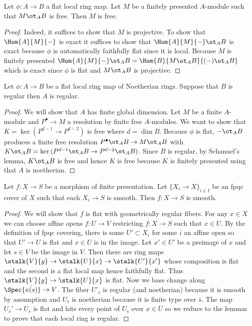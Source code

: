 \documentclass[12pt]{article}
\begin{document}
\begin{lemma}
Let $\phi : A \to B$ a flat local ring map. Let $M$ be a finitely presented $A$-module such that $M \ot_A B$ is free. Then $M$ is free.
\end{lemma}

\begin{proof}
Indeed, it suffices to show that $M$ is projective. To show that $\Hom{A}{M}{-}$ is exact it suffices to show that $\Hom{A}{M}{-} \ot_A B$ is exact because $\phi$ is automatically faithfully flat since it is local. Because $M$ is finitely presented $\Hom{A}{M}{-} \ot_A B = \Hom{B}{M \ot_A B}{(-) \ot_A B}$ which is exact since $\phi$ is flat and $M \ot_A B$ is projective.
\end{proof}

\begin{lemma}
Let $\phi : A \to B$ be a flat local ring map of Noetherian rings. Suppose that $B$ is regular then $A$ is regular.
\end{lemma}

\begin{proof}
We will show that $A$ has finite global dimension. Let $M$ be a finite $A$-module and $P^\bullet \to M$ a resolution by finite free $A$-modules. We want to show that $K = \ker{(P^{d-1} \to P^{d-2})}$ is free where $d = \dim{B}$. Because $\phi$ is flat, $-\ot_A B$ produces a finite free resolution $P^\bullet \ot_A B \to M \ot_A B$ with $K \ot_A B = \ker{(P^{d-1} \ot_A B \to P^{d-2} \ot_A B)}$. Since $B$ is regular, by Schanuel's lemma, $K \ot_A B$ is free and hence $K$ is free because $K$ is finitely presented using that $A$ is noetherian.
\end{proof}

\begin{prop}
Let $f : X \to S$ be a morphism of finite presentation. Let $\{ X_i \to X \}_{i \in I}$ be an fpqc cover of $X$ such that each $X_i \to S$ is smooth. Then $f : X \to S$ is smooth.
\end{prop}

\begin{proof}
We will show that $f$ is flat with geometrically regular fibers. For any $x \in X$ we can choose affine opens $f : U \to V$ restricting $f : X \to S$ such that $x \in U$. By the definition of fpqc covering, there is some $U' \subset X_i$ for some $i$ an affine open so that $U' \to U$ is flat and $x \in U$ is in the image. Let $x' \in U'$ be a preimage of $x$ and let $s \in V$ be the image in $V$. Then there are ring maps $\stalk{V}{y} \to \stalk{U}{x} \to \stalk{U'}{x'}$ whose composition is flat and the second is a flat local map hence faithfully flat. Thus $\stalk{V}{y} \to \stalk{U}{x}$ is flat. Now we base change along $\Spec{\bar{\kappa(s)}} \to V$. The fiber $U'_{\bar{s}}$ is regular (and noetherian) because it is smooth by assumption and $U_{\bar{s}}$ is noetherian because it is finite type over $\bar{s}$. The map $U_{\bar{s}}' \to U_{\bar{s}}$ is flat and hits every point of $U_{\bar{s}}$ over $x \in U$ so we reduce to the lemmas to prove that each local ring is regular.
\end{proof}
\end{document}
